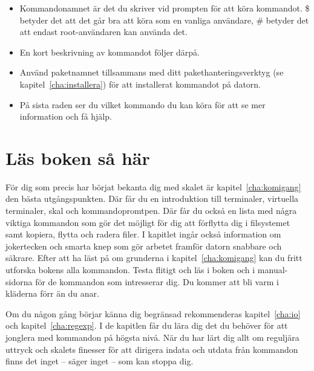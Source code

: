 \documentclass[10pt,a4paper,final]{book}
\newcommand{\charef}[1]{kapitel~\ref{#1}}
\newcommand{\negquarterhskip}{\hspace*{-.25\baselineskip}}
\newcommand{\xstandard}{}
\begin{document}
\vspace*{-.75\baselineskip}

\begin{itemize}

\item Kommandonamnet är det du skriver vid prompten för att köra kommandot. \$ betyder det att det går bra att köra som en vanliga användare, \# betyder det att endast root-användaren kan använda det. 

\item En kort beskrivning av kommandot följer därpå.

\item Använd paketnamnet tillsammans med ditt pakethanteringsverktyg (se \charef{cha:installera}) för att installerat kommandot på datorn. %

\item På sista raden ser du vilket kommando du kan köra för att se mer information och få hjälp.

\end{itemize}

\section{Läs boken så här}

För dig som precis har börjat bekanta dig med skalet är \charef{cha:komigang} den bästa utgångspunkten. Där får du en introduktion till terminaler, virtuella terminaler, skal och kommandopromtpen. Där får du också en lista med några viktiga kommandon som gör det möjligt för dig att förflytta dig i filsystemet samt kopiera, flytta och radera filer. I kapitlet ingår också information om jokertecken och smarta knep som gör arbetet framför datorn snabbare och säkrare. Efter att ha läst på om grunderna i \charef{cha:komigang} kan du fritt utforska bokens alla kommandon. Testa flitigt och läs i boken och i manual-sidorna för de kommandon som intresserar dig. Du kommer att bli varm i kläderna förr än du anar.

Om du någon gång börjar känna dig begränsad rekommenderas \charef{cha:io} och \charef{cha:regexp}. I de kapitlen får du lära dig det du behöver för att jonglera med kommandon på högsta nivå. När du har lärt dig allt om reguljära uttryck och skalets finesser för att dirigera indata och utdata från kommandon finns det inget -- säger inget -- som kan stoppa dig.
\end{document}
